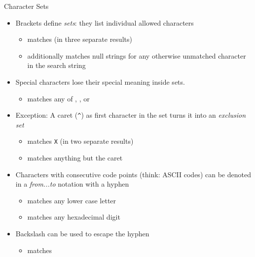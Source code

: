 \begin{frame}{Character Sets}
%
\begin{itemize}
\item Brackets define \emph{sets}: they list individual allowed characters
	\begin{itemize}
	\item \rx{[amc]\color{purple}+} matches  (in three separate results)
	\item \rx{[amc]\color{purple}*} additionally matches null strings for any otherwise unmatched character in the search string
	\end{itemize}
\pause
\item Special characters lose their special meaning inside sets. 
	\begin{itemize}
	\item \rx{[(*+)]} matches any of \qtt{\match{(}}, \qtt{\match{*}}, \qtt{\match{+}} or \qtt{\match{)}}
	\end{itemize}
\pause
\item Exception: A caret (\texttt{\textasciicircum}) as first character in the set turns it into an \emph{exclusion set}
	\begin{itemize}
	\item \rx{[\textasciicircum X]+} matches \texttt{X} (in two separate results)
	\item \rx{[\textasciicircum\textasciicircum]} matches anything but the caret
	\end{itemize}
\pause
\item Characters with consecutive code points (think: ASCII codes) can be denoted in a \emph{from...to} notation with a hyphen
	\begin{itemize}
	\item \rx{[a-z]} matches any lower case letter
	\item \rx{[0-9A-Fa-f]} matches any hexadecimal digit
	\end{itemize}
\item Backslash can be used to escape the hyphen
	\begin{itemize}
	\item \rx{[A\textbackslash-Z]} matches 
	\end{itemize}
\end{itemize}
%
\end{frame}


